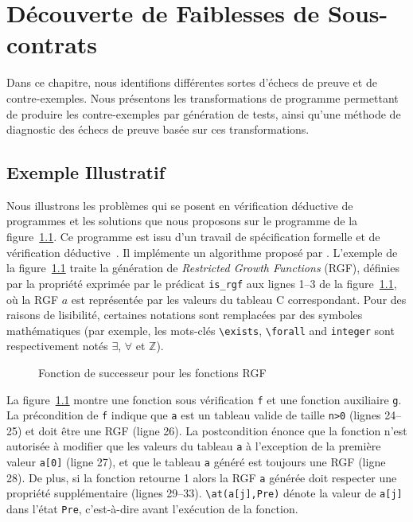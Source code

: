 
\chapter{Découverte de Faiblesses de Sous-contrats}
\label{sec:swd}

\chapterintro

Dans ce chapitre, nous identifions différentes sortes d'échecs de preuve et de
contre-exemples.
Nous présentons les transformations de programme permettant de produire les
contre-exemples par génération de tests, ainsi qu'une méthode de diagnostic des
échecs de preuve basée sur ces transformations.



\section{Exemple Illustratif}
\label{sec:ce-example}


Nous illustrons les problèmes qui se posent en vérification déductive de
programmes et les solutions que nous proposons sur le programme de la
figure~\ref{fig:rgf1}.
Ce programme est issu d'un travail de spécification formelle et de vérification
déductive~\cite{Genestier/TAP15}.
Il implémente un algorithme proposé par \cite[page 235]{Arndt/10}.
L'exemple de la figure~\ref{fig:rgf1} traite la génération de
{\em Restricted Growth Functions} (RGF), définies par la propriété exprimée par
le prédicat \eacsl \lstinline{is_rgf} aux lignes 1--3 de la
figure~\ref{fig:rgf1}, où la RGF $a$ est représentée par les valeurs du tableau
C correspondant.
Pour des raisons de lisibilité, certaines notations \eacsl sont remplacées par
des symboles mathématiques (par exemple, les mots-clés 
\lstinline[style=c]{\exists}, \lstinline[style=c]{\forall} and
\lstinline[style=c]{integer} sont respectivement notés $\exists$, $\forall$ et
$\mathbb{Z}$).


\begin{figure}[tb]
  \centering
  
  \caption{Fonction de successeur pour les fonctions RGF\label{fig:rgf1}}
\end{figure}


La figure~\ref{fig:rgf1} montre une fonction sous vérification \lstinline{f} 
et une fonction auxiliaire \lstinline{g}.
La précondition de \lstinline{f} indique que \lstinline{a} est un tableau valide
de taille \lstinline{n>0} (lignes 24--25) et doit être une RGF (ligne 26).
La postcondition énonce que la fonction n'est autorisée à modifier que les
valeurs du tableau \lstinline{a} à l'exception de la première valeur
\lstinline{a[0]} (ligne 27), et que le tableau \lstinline{a} généré est toujours
une RGF (ligne 28).
De plus, si la fonction retourne 1 alors la RGF \lstinline{a} générée doit
respecter une propriété supplémentaire (lignes 29--33).
\lstinline{\at(a[j],Pre)} dénote la valeur de \lstinline{a[j]} dans l'état
\lstinline{Pre}, c'est-à-dire avant l'exécution de la fonction.


